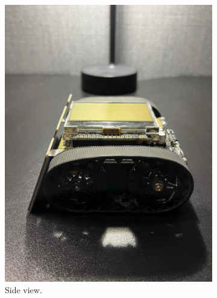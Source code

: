\documentclass{l4proj}
\begin{document}
\begin{figure}
\begin{subfigure}{0.24\textwidth}
        \includegraphics[width=\textwidth]{images/robot-side.jpg}
        \caption{Side view.}
        \label{fig:side-view}  
    \end{subfigure}
    \begin{subfigure}{0.24\textwidth}
        \centering

\end{subfigure}
\end{figure}
\end{document}
